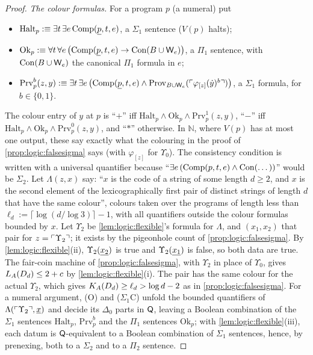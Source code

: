 \begin{proof}
\emph{The colour formulas.} For a program $p$ (a numeral) put
\begin{itemize}[leftmargin=*]
\item $\mathrm{Halt}_p:\equiv\exists t\,\exists e\,\mathrm{Comp}(\underline{p},t,e)$, a $\Sigma_1$ sentence ($V(p)$ halts);
\item $\mathrm{Ok}_p:\equiv\forall t\,\forall e\,\big(\mathrm{Comp}(\underline{p},t,e)\to\mathrm{Con}(B\cup\mathsf{W}_{e})\big)$, a $\Pi_1$ sentence, with $\mathrm{Con}(B\cup\mathsf{W}_{e})$ the canonical $\Pi_1$ formula in $e$;
\item $\mathrm{Prv}^b_p(z,y):\equiv\exists t\,\exists e\,\big(\mathrm{Comp}(\underline{p},t,e)\wedge\mathrm{Prov}_{B\cup\mathsf{W}_{e}}(\ulcorner \varphi_{[z]}(\dot y)^b\urcorner)\big)$, a $\Sigma_1$ formula, for $b\in\{0,1\}$.
\end{itemize}
The colour entry of $y$ at $p$ is ``$+$'' iff $\mathrm{Halt}_p\wedge\mathrm{Ok}_p\wedge\mathrm{Prv}^1_p(z,y)$, ``$-$'' iff $\mathrm{Halt}_p\wedge\mathrm{Ok}_p\wedge\mathrm{Prv}^0_p(z,y)$, and ``$*$'' otherwise. In $\mathbb N$, where $V(p)$ has at most one output, these say exactly what the colouring in the proof of \cref{prop:logic:falsesigma} says (with $\varphi_{[z]}$ for $\Upsilon_0$). The consistency condition is written with a universal quantifier because ``$\exists e\,(\mathrm{Comp}(p,t,e)\wedge\mathrm{Con}(\dots))$'' would be $\Sigma_2$. Let $\Lambda(z,x)$ say: ``$x$ is the code of a string of some length $d\ge2$, and $x$ is the second element of the lexicographically first pair of distinct strings of length $d$ that have the same colour'', colours taken over the programs of length less than $\ell_d:=\lceil\log(d/\log3)\rceil-1$, with all quantifiers outside the colour formulas bounded by $x$. Let $\Upsilon_2$ be \cref{lem:logic:flexible}'s formula for $\Lambda$, and $(x_1,x_2)$ that pair for $z=\ulcorner \Upsilon_2\urcorner$; it exists by the pigeonhole count of \cref{prop:logic:falsesigma}. By \cref{lem:logic:flexible}(ii), $\Upsilon_2(\underline{x_2})$ is true and $\Upsilon_2(\underline{x_1})$ is false, so both data are true. The fair-coin machine of \cref{prop:logic:falsesigma}, with $\Upsilon_2$ in place of $\Upsilon_0$, gives $L_{A}(D_d)\le2+c$ by \cref{lem:logic:flexible}(i). The pair has the same colour for the actual $\Upsilon_2$, which gives $K_{A}(D_d)\ge\ell_d>\log d-2$ as in \cref{prop:logic:falsesigma}. For a numeral argument, (O) and ($\Sigma_1$C) unfold the bounded quantifiers of $\Lambda(\ulcorner \Upsilon_2\urcorner,\underline{x})$ and decide its $\Delta_0$ parts in $\mathsf{Q}$, leaving a Boolean combination of the $\Sigma_1$ sentences $\mathrm{Halt}_p$, $\mathrm{Prv}^b_p$ and the $\Pi_1$ sentences $\mathrm{Ok}_p$; with \cref{lem:logic:flexible}(iii), each datum is $\mathsf{Q}$-equivalent to a Boolean combination of $\Sigma_1$ sentences, hence, by prenexing, both to a $\Sigma_2$ and to a $\Pi_2$ sentence.
\end{proof}

